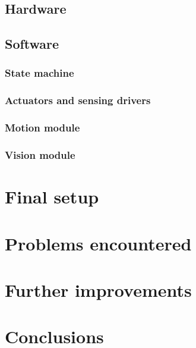 \documentclass[11pt]{article}
\begin{document}


\subsection{Hardware}


	
\subsection{Software}



\subsubsection{State machine}



\subsubsection{Actuators and sensing drivers}


\subsubsection{Motion module}


\subsubsection{Vision module}


\section{ Final setup }


\section{Problems encountered}




\section{Further improvements}
\label{sec:future-improvements}



\section{Conclusions}



\clearpage
\printbibliography
\end{document}
